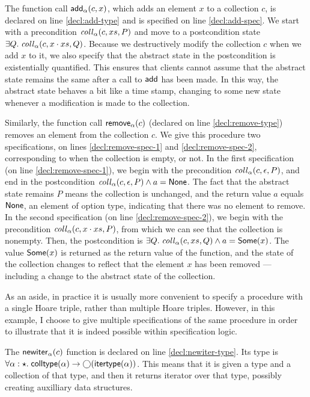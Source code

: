 The function call $\mathsf{add}_\alpha(c, x)$, which adds an element $x$
to a collection $c$, is declared on line \ref{decl:add-type} and is
specified on line \ref{decl:add-spec}. We start with a precondition
$\mathit{coll}_\alpha(c, xs, P)$ and move to a postcondition state
$\exists Q.\; \mathit{coll}_\alpha(c, x\cdot xs, Q)$. Because we
destructively modify the collection $c$ when we add $x$ to it, we also
specify that the abstract state in the postcondition is existentially
quantified. This ensures that clients cannot assume that the abstract
state remains the same after a call to $\mathsf{add}$ has been made. In
this way, the abstract state behaves a bit like a time stamp, changing
to some new state whenever a modification is made to the collection. 

Similarly, the function call $\mathsf{remove}_\alpha(c)$ (declared on
line \ref{decl:remove-type}) removes an element from the collection
$c$. We give this procedure two specifications, on lines
\ref{decl:remove-spec-1} and \ref{decl:remove-spec-2}, corresponding
to when the collection is empty, or not.  In the first specification
(on line \ref{decl:remove-spec-1}), we begin with the precondition
$\mathit{coll}_\alpha(c, \epsilon, P)$, and end in the postcondition
$\mathit{coll}_\alpha(c, \epsilon, P) \land a = \mathsf{None}$. The fact that the
abstract state remains $P$ means the collection is unchanged, and the
return value $a$ equals $\mathsf{None}$, an element of option type, indicating
that there was no element to remove.  In the second specification (on
line \ref{decl:remove-spec-2}), we begin with the precondition
$\mathit{coll}_\alpha(c, x\cdot xs, P)$, from which we can see that the
collection is nonempty. Then, the postcondition is $\exists Q.\;
\mathit{coll}_\alpha(c, xs, Q) \land a = \mathsf{Some}(x)$.  The value $\mathsf{Some}(x)$
is returned as the return value of the function, and the state of the
collection changes to reflect that the element $x$ has been removed
--- including a change to the abstract state of the collection.

As an aside, in practice it is usually more convenient to specify a
procedure with a single Hoare triple, rather than multiple Hoare
triples. However, in this example, I choose to give multiple
specifications of the same procedure in order to illustrate that it is
indeed possible within specification logic.

The $\mathsf{newiter}_\alpha(c)$ function is declared on line
\ref{decl:newiter-type}.  Its type is $\forall \alpha:\star.\;
\mathsf{colltype}(\alpha) \to \bigcirc{(\mathsf{itertype}(\alpha))}$.  This means that
it is given a type and a collection of that type, and then it returns
iterator over that type, possibly creating auxilliary data structures.


